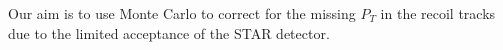 \documentclass[12pt]{article}
\begin{document}


Our aim is to use Monte Carlo to correct for the missing $P_{T}$ in the recoil tracks due to
the limited acceptance of the STAR detector. 




\end{document}
